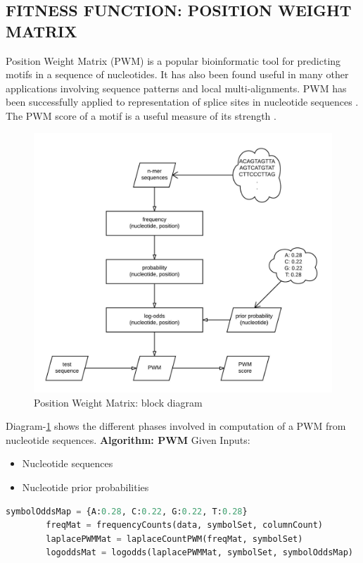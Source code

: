 \documentclass[12pt,a4paper]{article}
\begin{document}
	\subsection{FITNESS FUNCTION: POSITION WEIGHT MATRIX} \label{sec-pwm}
	Position Weight Matrix (PWM) is a popular bioinformatic tool for predicting motifs in a sequence of nucleotides. It has also been found useful in many other applications involving sequence patterns and local multi-alignments. PWM has been successfully applied to representation of splice sites in nucleotide sequences \cite{pwm-2}. The PWM score of a motif is a useful measure of its strength \cite{pwm-1}. \par
	
	\begin{figure}[H]
		\label{fig:pwm}
		\includegraphics[width=\textwidth]{"pwm"}
		\caption{Position Weight Matrix: block diagram}
		\centering
	\end{figure}
	
	Diagram-\ref{fig:pwm} shows the different phases involved in computation of a PWM from nucleotide sequences.
	\textbf{Algorithm: PWM}
	Given Inputs:
	\begin{itemize}
	\item Nucleotide sequences
	\item Nucleotide prior probabilities
	\end{itemize}
	
	\begin{lstlisting}[language=Python]
        symbolOddsMap = {A:0.28, C:0.22, G:0.22, T:0.28}
        freqMat = frequencyCounts(data, symbolSet, columnCount)
        laplacePWMMat = laplaceCountPWM(freqMat, symbolSet)
        logoddsMat = logodds(laplacePWMMat, symbolSet, symbolOddsMap)	
	\end{lstlisting}
	
\end{document}
